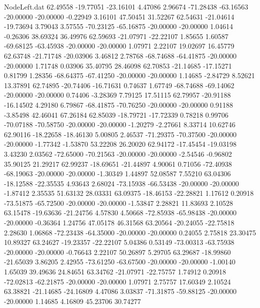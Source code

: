 \begin{filecontents}{NodeLeft.dat}
  62.49558  -19.77051  -23.16101     4.47086    2.96674  -71.28438  -63.16563  -20.00000  -20.00000   -0.22949    3.16101   47.50451   31.52267
  62.54631  -21.04614  -19.73694     3.79043    3.57555  -70.23125  -65.16875  -20.00000  -20.00000    1.04614   -0.26306   38.69324   36.49976
  62.59693  -21.07971  -22.22107     1.85655    1.60587  -69.68125  -63.45938  -20.00000  -20.00000    1.07971    2.22107   19.02697   16.45779
  62.63748  -21.71748  -20.03906     3.46812    2.78768  -68.74688  -64.41875  -20.00000  -20.00000    1.71748    0.03906   35.40795   28.46098
  62.70853  -21.14685  -17.15271     0.81799    1.28356  -68.64375  -67.41250  -20.00000  -20.00000    1.14685   -2.84729    8.52621   13.37891
  62.74895  -20.74406  -16.71631     0.74637    1.67749  -68.74688  -69.14062  -20.00000  -20.00000    0.74406   -3.28369    7.79125   17.51115
  62.79957  -20.91188  -16.14502     4.29180    6.79867  -68.41875  -70.76250  -20.00000  -20.00000    0.91188   -3.85498   42.46041   67.26184
  62.85039  -18.79721  -17.72339     0.78218    0.99706  -70.07188  -70.58750  -20.00000  -20.00000   -1.20279   -2.27661    8.33714   10.62746
  62.90116  -18.22658  -18.46130     5.00805    2.46537  -71.29375  -70.37500  -20.00000  -20.00000   -1.77342   -1.53870   53.22208   26.20020
  62.94172  -17.45454  -19.03198     3.43230    2.03562  -72.65000  -70.21563  -20.00000  -20.00000   -2.54546   -0.96802   35.90125   21.29217
  62.99237  -18.69651  -21.44897     4.90061    0.71056  -72.40938  -68.19063  -20.00000  -20.00000   -1.30349    1.44897   52.08587    7.55210
  63.04306  -18.12588  -22.35535     4.93643    2.68024  -73.15938  -66.53438  -20.00000  -20.00000   -1.87412    2.35535   51.63132   28.03331
  63.09375  -18.46153  -22.28821     1.17612    0.20918  -73.51875  -65.72500  -20.00000  -20.00000   -1.53847    2.28821   11.83693    2.10528
  63.15478  -19.63636  -21.24756     4.57830    4.50668  -72.85938  -65.98438  -20.00000  -20.00000   -0.36364    1.24756   47.05178   46.31568
  63.20564  -20.24055  -22.75818     2.28630    1.06868  -72.23438  -64.35000  -20.00000  -20.00000    0.24055    2.75818   23.30475   10.89327
  63.24627  -19.23357  -22.22107     5.04386    0.53149  -73.00313  -63.75938  -20.00000  -20.00000   -0.76643    2.22107   50.26897    5.29705
  63.29687  -18.99860  -21.65039     3.86205    2.42955  -73.61250  -63.67500  -20.00000  -20.00000   -1.00140    1.65039   39.49636   24.84651
  63.34762  -21.07971  -22.75757     1.74912    0.20918  -72.02813  -62.21875  -20.00000  -20.00000    1.07971    2.75757   17.60349    2.10524
  63.38821  -21.14685  -24.16809     4.47086    3.03837  -71.31875  -59.88125  -20.00000  -20.00000    1.14685    4.16809   45.23706   30.74277

\end{filecontents}
